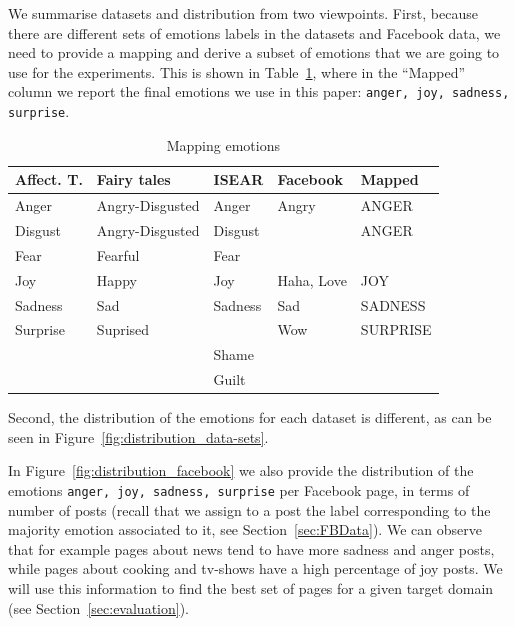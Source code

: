 \documentclass[11pt]{article}
\begin{document}
We summarise datasets and distribution from two viewpoints. First, because there are different sets of emotions labels in the datasets and Facebook data, we need to provide a mapping and derive a subset of emotions that we are going to use for the experiments. This is shown in Table~\ref{overview_data-sets}, where in the ``Mapped'' column we report the final emotions we use in this paper: \texttt{anger, joy, sadness, surprise}. 
\begin{table}
\begin{small}
\caption{Mapping emotions\label{overview_data-sets}}
\centering
\begin{tabular}{|l|l|l|l|l|}
\hline
\textbf{Affect. T.} & \textbf{Fairy tales} & \textbf{ISEAR} & \textbf{Facebook} & \textbf{Mapped} \\ \hline
Anger            & Angry-Disgusted      & Anger               & Angry   & ANGER          \\ \hline
Disgust          & Angry-Disgusted      & Disgust               &    &  ANGER              \\ \hline
Fear             & Fearful              & Fear               &      &              \\ \hline
Joy              & Happy                & Joy                & Haha, Love & JOY\\ \hline
Sadness          & Sad                  & Sadness               & Sad     & SADNESS          \\ \hline
Surprise         & Suprised             &                & Wow          & SURPRISE     \\ 
\hline
                 &                      & Shame               &       &         \\ \hline
                 &                      & Guilt               &       &         \\                  
\hline
\end{tabular}
\end{small}
\end{table}
Second, the distribution of the emotions for each dataset is different, as can be seen in Figure~\ref{fig:distribution_data-sets}. 

In Figure~\ref{fig:distribution_facebook} we also provide the distribution of the emotions \texttt{anger, joy, sadness, surprise} per Facebook page, in terms of number of posts (recall that we assign to a post the label corresponding to the majority emotion associated to it, see Section~\ref{sec:FBData}). We can observe that for example pages about news  tend to have more sadness and anger posts, while pages about cooking and tv-shows have a high percentage of joy posts. We will use this information to find the best set of pages for a given target domain (see Section~\ref{sec:evaluation}).
\end{document}

